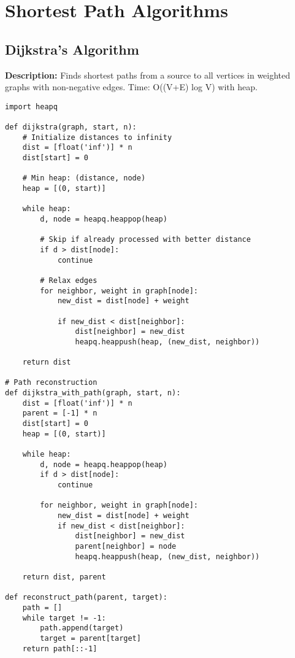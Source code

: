 \section{Shortest Path Algorithms}

\subsection{Dijkstra's Algorithm}
\textbf{Description:} Finds shortest paths from a source to all vertices in weighted graphs with non-negative edges. Time: O((V+E) log V) with heap.

\begin{lstlisting}
import heapq

def dijkstra(graph, start, n):
    # Initialize distances to infinity
    dist = [float('inf')] * n
    dist[start] = 0
    
    # Min heap: (distance, node)
    heap = [(0, start)]
    
    while heap:
        d, node = heapq.heappop(heap)
        
        # Skip if already processed with better distance
        if d > dist[node]:
            continue
        
        # Relax edges
        for neighbor, weight in graph[node]:
            new_dist = dist[node] + weight
            
            if new_dist < dist[neighbor]:
                dist[neighbor] = new_dist
                heapq.heappush(heap, (new_dist, neighbor))
    
    return dist

# Path reconstruction
def dijkstra_with_path(graph, start, n):
    dist = [float('inf')] * n
    parent = [-1] * n
    dist[start] = 0
    heap = [(0, start)]
    
    while heap:
        d, node = heapq.heappop(heap)
        if d > dist[node]:
            continue
        
        for neighbor, weight in graph[node]:
            new_dist = dist[node] + weight
            if new_dist < dist[neighbor]:
                dist[neighbor] = new_dist
                parent[neighbor] = node
                heapq.heappush(heap, (new_dist, neighbor))
    
    return dist, parent

def reconstruct_path(parent, target):
    path = []
    while target != -1:
        path.append(target)
        target = parent[target]
    return path[::-1]
\end{lstlisting}

